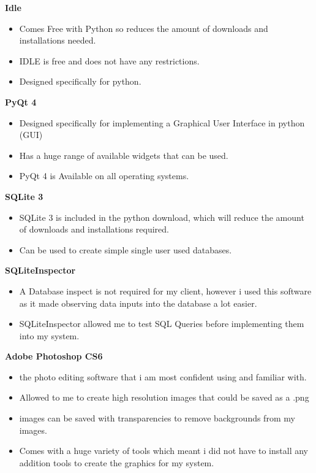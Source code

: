 \textbf{Idle}
\begin{itemize}
	\item Comes Free with Python so reduces the amount of downloads and installations needed.
	\item IDLE is free and does not have any restrictions.
	\item Designed specifically for python.
\end{itemize}
\vspace{5mm}

\textbf{PyQt 4}
\begin{itemize}
	\item Designed specifically for implementing a Graphical User Interface in python (GUI)
	\item Has a huge range of available widgets that can be used.
	\item PyQt 4 is Available on all operating systems.
\end{itemize}
\vspace{5mm}


\textbf{SQLite 3}
\begin{itemize}
	\item SQLite 3 is included in the python download, which will reduce the amount of downloads and installations required.
	\item Can be used to create simple single user used databases.
\end{itemize}
\vspace{5mm}


\textbf{SQLiteInspector}
\begin{itemize}
	\item A Database inspect is not required for my client, however i used this software as it made observing data inputs into the database a lot easier.
	\item SQLiteInspector allowed me to test SQL Queries before implementing them into my system.
\end{itemize}
\vspace{5mm}

\pagebreak

\textbf{Adobe Photoshop CS6}
\begin{itemize}
	\item the photo editing software that i am most confident using and familiar with.
	\item Allowed to me to create high resolution images that could be saved as a .png
	\item images can be saved with transparencies to remove backgrounds from my images.
	\item Comes with a huge variety of tools which meant i did not have to install any addition tools to create the graphics for my system.
\end{itemize}
\vspace{5mm}


